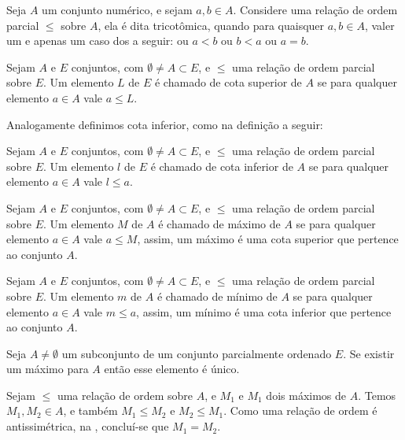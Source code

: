 \documentclass[../main.tex]{subfiles}
\begin{document}
\begin{defi}
    Seja $A$ um conjunto numérico, e sejam $a,b \in A$. Considere uma relação de ordem parcial $\leq$ sobre $A$, ela é dita tricotômica,
    quando para quaisquer $a,b \in A$, valer um e apenas um caso dos a seguir: ou $a < b$ ou $b < a$ ou $a = b$.
\end{defi}

\begin{defi}\label{agb-def-cotaSup}
    Sejam $A$ e $E$ conjuntos, com $\emptyset \neq A \subset E$, e $\leq$ uma relação de ordem parcial sobre $E$. Um elemento $L$ de $E$ é chamado de cota superior de $A$ se para qualquer elemento $a \in A$ vale $a \leq L$.
\end{defi}
Analogamente definimos cota inferior, como na definição a seguir:
\begin{defi}\label{agb-def-cotaInf}
    Sejam $A$ e $E$ conjuntos, com $\emptyset \neq A \subset E$, e $\leq$ uma relação de ordem parcial sobre $E$. Um elemento $l$ de $E$ é chamado de cota inferior de $A$ se para qualquer elemento $a \in A$ vale $l \leq a$.
\end{defi}
\begin{defi}\label{agb-def-maximo}
     Sejam $A$ e $E$ conjuntos, com $\emptyset \neq A \subset E$, e $\leq$ uma relação de ordem parcial sobre $E$. Um elemento $M$ de $A$ é chamado de máximo de $A$ se para qualquer elemento $a \in A$ vale $a \leq M$, assim, um máximo é uma cota superior que pertence ao conjunto $A$.   
\end{defi}
\begin{defi}\label{agb-def-minimo}
     Sejam $A$ e $E$ conjuntos, com $\emptyset \neq A \subset E$, e $\leq$ uma relação de ordem parcial sobre $E$. Um elemento $m$ de $A$ é chamado de mínimo de $A$ se para qualquer elemento $a \in A$ vale $m \leq a$, assim, um mínimo é uma cota inferior que pertence ao conjunto $A$.   
\end{defi}
\begin{prop}
    Seja $A \neq \emptyset$ um subconjunto de um conjunto parcialmente ordenado $E$. Se existir um máximo para $A$ então esse elemento é único.
\end{prop} 
\begin{dem}
    Sejam $\leq$ uma relação de ordem sobre $A$, e $M_1$ e $M_1$ dois máximos de $A$. Temos $M_1, M_2 \in A$, e também $M_1 \leq M_2$  e $M_2 \leq M_1$. Como uma relação de ordem é antissimétrica, na , concluí-se que $M_1 = M_2$.
\end{dem}
\end{document}
